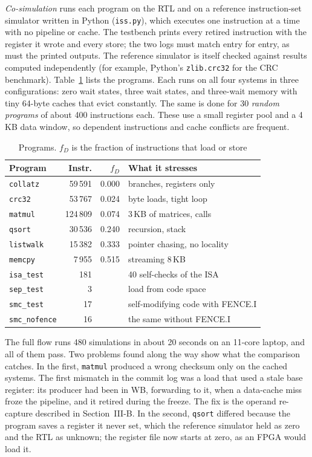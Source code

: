 \documentclass[conference]{IEEEtran}
\begin{document}
\emph{Co-simulation} runs each program on the RTL and on a reference instruction-set simulator written in Python (\texttt{iss.py}), which executes one instruction at a time with no pipeline or cache. The testbench prints every retired instruction with the register it wrote and every store; the two logs must match entry for entry, as must the printed outputs. The reference simulator is itself checked against results computed independently (for example, Python's \texttt{zlib.crc32} for the CRC benchmark). Table~\ref{tab:programs} lists the programs. Each runs on all four systems in three configurations: zero wait states, three wait states, and three-wait memory with tiny 64-byte caches that evict constantly. The same is done for 30 \emph{random programs} of about 400 instructions each. These use a small register pool and a 4\,KB data window, so dependent instructions and cache conflicts are frequent.

\begin{table}[t]
\centering
\caption{Programs. $f_D$ is the fraction of instructions that load or store}
\label{tab:programs}
\footnotesize
\setlength{\tabcolsep}{3pt}
\begin{tabular}{@{}lrrl@{}}
\toprule
Program & Instr. & $f_D$ & What it stresses \\
\midrule
\texttt{collatz} & 59\,591 & 0.000 & branches, registers only \\
\texttt{crc32} & 53\,767 & 0.024 & byte loads, tight loop \\
\texttt{matmul} & 124\,809 & 0.074 & 3\,KB of matrices, calls \\
\texttt{qsort} & 30\,536 & 0.240 & recursion, stack \\
\texttt{listwalk} & 15\,382 & 0.333 & pointer chasing, no locality \\
\texttt{memcpy} & 7\,955 & 0.515 & streaming 8\,KB \\
\midrule
\texttt{isa\_test} & 181 & & 40 self-checks of the ISA \\
\texttt{sep\_test} & 3 & & load from code space \\
\texttt{smc\_test} & 17 & & self-modifying code with FENCE.I \\
\texttt{smc\_nofence} & 16 & & the same without FENCE.I \\
\bottomrule
\end{tabular}
\end{table}

The full flow runs 480 simulations in about 20 seconds on an 11-core laptop, and all of them pass. Two problems found along the way show what the comparison catches. In the first, \texttt{matmul} produced a wrong checksum only on the cached systems. The first mismatch in the commit log was a load that used a stale base register: its producer had been in WB, forwarding to it, when a data-cache miss froze the pipeline, and it retired during the freeze. The fix is the operand re-capture described in Section~III-B. In the second, \texttt{qsort} differed because the program saves a register it never set, which the reference simulator held as zero and the RTL as unknown; the register file now starts at zero, as an FPGA would load it.
\end{document}
